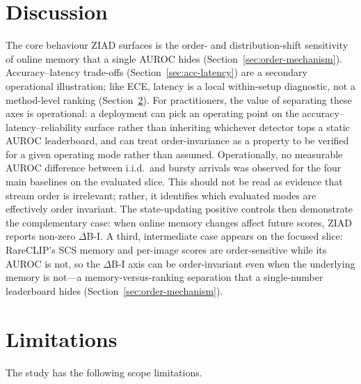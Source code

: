 \documentclass[runningheads]{llncs}
\newcommand{\secref}[1]{Section~\ref{#1}}
\begin{document}
\section{Discussion}
The core behaviour ZIAD surfaces is the order- and distribution-shift
sensitivity of online memory that a single AUROC hides
(\secref{sec:order-mechanism}). Accuracy--latency trade-offs
(\secref{sec:acc-latency}) are a secondary operational illustration; like ECE,
latency is a local within-setup diagnostic, not a method-level ranking
(\secref{sec:limitations}).
For practitioners, the value of separating these axes is operational: a
deployment can pick an operating point on the accuracy--latency--reliability
surface rather than inheriting whichever detector tops a static AUROC
leaderboard, and can treat order-invariance as a property to be verified for a
given operating mode rather than assumed.
Operationally, no measurable AUROC difference between i.i.d.\ and bursty
arrivals was observed for the four main baselines on the evaluated slice.
This should not be read as evidence that stream order is irrelevant; rather,
it identifies which evaluated modes are effectively order invariant. The
state-updating positive controls then demonstrate the complementary case:
when online memory changes affect future scores, ZIAD reports non-zero
$\Delta$B-I. A third, intermediate case appears on the focused slice: RareCLIP's
SCS memory and per-image scores are order-sensitive while its AUROC is not, so
the $\Delta$B-I axis can be order-invariant even when the underlying memory is
not---a memory-versus-ranking separation that a single-number leaderboard hides
(\secref{sec:order-mechanism}).

\section{Limitations}
\label{sec:limitations}
The study has the following scope limitations.
\end{document}

